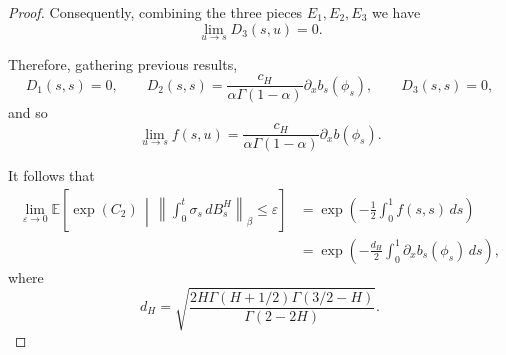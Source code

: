 \documentclass[preprint,12pt]{elsarticle}
\theoremstyle{definition}  %
\theoremstyle{plain}  %
\begin{document}
\begin{proof}
Consequently, combining the three pieces \(E_1,E_2,E_3\) we have
\[
\lim_{u\to s} D_3(s,u)=0.
\]

Therefore, gathering previous results,
\[
D_1(s,s)=0,\qquad D_2(s,s)=\frac{c_H}{\alpha\Gamma(1-\alpha)}\partial_x b_s(\phi_s),
\qquad D_3(s,s)=0,
\]
and so
\[
\lim_{u\to s} f(s,u)=\frac{c_H}{\alpha\Gamma(1-\alpha)}\partial_x b(\phi_s).
\]

It follows that  
\begin{align*}
\lim_{\varepsilon \to 0} \mathbb{E} \left[ \exp(C_2) \,\middle|\, \left\| \int_0^t \sigma_s\, dB^H_s \right\|_\beta \leq \varepsilon \right] 
&= \exp\left( -\frac{1}{2} \int_0^1 f(s,s)\,ds \right) \\
&= \exp\left( -\frac{d_H}{2} \int_0^1 \partial_x b_s(\phi_s)\,ds \right),
\end{align*}
where
\begin{equation*}
    d_H= \sqrt{\frac{2H\Gamma(H+1/2)\Gamma(3/2-H)}{\Gamma(2-2H)}}.
\end{equation*}











\end{proof}
\end{document}
